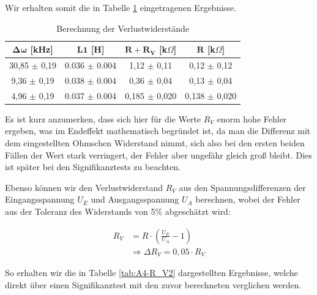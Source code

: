 \documentclass{article}
\begin{document}
Wir erhalten somit die in Tabelle \ref{tab:A4-R_V} eingetragenen Ergebnisse.

\phantom{.}

\begin{table}[!h]
    \centering
    \begin{tabular}{cccc}
        \hline
        $\bm{\Delta \omega}$ [kHz] & $\bm{L1}$ [H] & $\bm{R+R_V}$ [k$\Omega$] & $\bm{R}$ [k$\Omega$]  \\ \hline
        30,85  $\pm$ 0,19 & 0.036 $\pm$ 0.004 &   1,12 $\pm$ 0,11      &  0,12 $\pm$    0,12 \\
          9,36 $\pm$ 0,19 & 0.038 $\pm$ 0.004 &    0,36 $\pm$       0,04 &  0,13 $\pm$ 0,04 \\
          4,96 $\pm$ 0,19 & 0.037 $\pm$ 0.004 &    0,185 $\pm$       0,020 &  0,138 $\pm$  0,020 \\ \hline
    \end{tabular}%
    \caption{Berechnung der Verlustwiderstände}
    \label{tab:A4-R_V}
\end{table}

\phantom{.}

Es ist kurz anzumerken, dass sich hier für die Werte $R_V$ enorm hohe Fehler ergeben, was im Endeffekt mathematisch begründet ist, da man die Differenz mit dem eingestellten Ohmschen Widerstand nimmt, sich also bei den ersten beiden Fällen der Wert stark verringert, der Fehler aber ungefähr gleich groß bleibt. Dies ist später bei den Signifikanztests zu beachten.

Ebenso können wir den Verlustwiderstand $R_V$ aus den Spannungsdifferenzen der Eingangsspannung $U_E$ und Ausgangsspannung $U_A$ berechnen, wobei der Fehler aus der Toleranz des Widerstands von 5\% abgeschätzt wird: 

\begin{equation}
    \begin{split}
        R_V &= R \cdot \left( \frac{U_E}{U_A} - 1 \right) \\
        &\Rightarrow \Delta R_V = 0,05 \cdot R_V
    \end{split}
\end{equation}

So erhalten wir die in Tabelle \ref{tab:A4-R_V2} dargestellten Ergebnisse, welche direkt über einen Signifikanztest mit den zuvor berechneten verglichen werden. 
\end{document}
